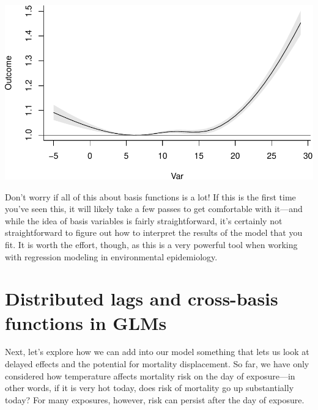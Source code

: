 \documentclass[
]{book}
\newenvironment{Shaded}{\begin{snugshade}}{\end{snugshade}}
\newcommand{\DataTypeTok}[1]{\textcolor[rgb]{0.13,0.29,0.53}{#1}}
\newcommand{\DecValTok}[1]{\textcolor[rgb]{0.00,0.00,0.81}{#1}}
\newcommand{\KeywordTok}[1]{\textcolor[rgb]{0.13,0.29,0.53}{\textbf{#1}}}
\newcommand{\NormalTok}[1]{#1}
\newcommand{\OperatorTok}[1]{\textcolor[rgb]{0.81,0.36,0.00}{\textbf{#1}}}
\newcommand{\StringTok}[1]{\textcolor[rgb]{0.31,0.60,0.02}{#1}}
\begin{document}
\begin{Shaded}
\end{Shaded}

\includegraphics{adv_epi_analysis_files/figure-latex/unnamed-chunk-83-1.pdf}

Don't worry if all of this about basis functions is a lot! If this is the first time you've
seen this, it will likely take a few passes to get comfortable with it---and while the idea
of basis variables is fairly straightforward, it's certainly not straightforward to figure
out how to interpret the results of the model that you fit. It is worth the effort, though,
as this is a very powerful tool when working with regression modeling in environmental
epidemiology.

\hypertarget{distributed-lags-and-cross-basis-functions-in-glms}{%
\section{Distributed lags and cross-basis functions in GLMs}\label{distributed-lags-and-cross-basis-functions-in-glms}}

Next, let's explore how we can add into our model something that lets us look at
delayed effects and the potential for mortality displacement. So far, we have only
considered how temperature affects mortality risk on the day of exposure---in other
words, if it is very hot today, does risk of mortality go up substantially today?
For many exposures, however, risk can persist after the day of exposure.
\end{document}
